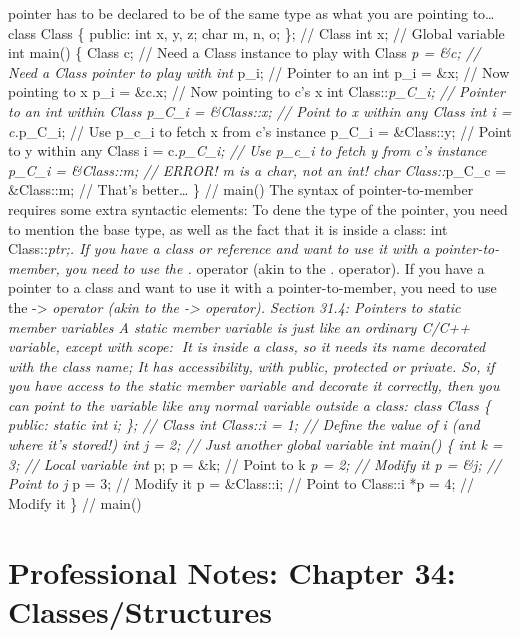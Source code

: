 pointer has to be declared to be of the same type as what you are
pointing to\ldots{} class Class \{ public: int x, y, z; char m, n, o;
\}; // Class int x; // Global variable int main() \{ Class c; // Need a
Class instance to play with Class \emph{p = \&c; // Need a Class pointer
to play with int }p\_i; // Pointer to an int p\_i = \&x; // Now pointing
to x p\_i = \&c.x; // Now pointing to c's x int Class::\emph{p\_C\_i; //
Pointer to an int within Class p\_C\_i = \&Class::x; // Point to x
within any Class int i = c.}p\_C\_i; // Use p\_c\_i to fetch x from c's
instance p\_C\_i = \&Class::y; // Point to y within any Class i =
c.\emph{p\_C\_i; // Use p\_c\_i to fetch y from c's instance p\_C\_i =
\&Class::m; // ERROR! m is a char, not an int! char Class::}p\_C\_c =
\&Class::m; // That's better\ldots{} \} // main() The syntax of
pointer-to-member requires some extra syntactic elements: To dene the
type of the pointer, you need to mention the base type, as well as the
fact that it is inside a class: int Class::\emph{ptr;. If you have a
class or reference and want to use it with a pointer-to-member, you need
to use the .} operator (akin to the . operator). If you have a pointer
to a class and want to use it with a pointer-to-member, you need to use
the -\textgreater{}\emph{ operator (akin to the -\textgreater{}
operator). Section 31.4: Pointers to static member variables A static
member variable is just like an ordinary C/C++ variable, except with
scope: It is inside a class, so it needs its name decorated with the
class name; It has accessibility, with public, protected or private. So,
if you have access to the static member variable and decorate it
correctly, then you can point to the variable like any normal variable
outside a class: class Class \{ public: static int i; \}; // Class int
Class::i = 1; // Define the value of i (and where it's stored!) int j =
2; // Just another global variable int main() \{ int k = 3; // Local
variable int }p; p = \&k; // Point to k \emph{p = 2; // Modify it p =
\&j; // Point to j }p = 3; // Modify it p = \&Class::i; // Point to
Class::i *p = 4; // Modify it \} // main()

\hypertarget{professional-notes-chapter-34-classesstructures-1}{%
\section{Professional Notes: Chapter 34:
Classes/Structures}\label{professional-notes-chapter-34-classesstructures-1}}

